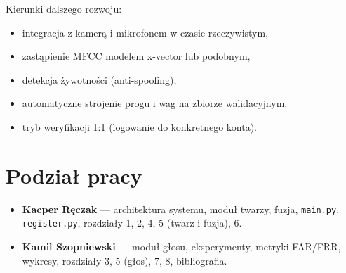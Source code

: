 Kierunki dalszego rozwoju:
\begin{itemize}
    \item integracja z kamerą i mikrofonem w czasie rzeczywistym,
    \item zastąpienie MFCC modelem x-vector lub podobnym,
    \item detekcja żywotności (anti-spoofing),
    \item automatyczne strojenie progu i wag na zbiorze walidacyjnym,
    \item tryb weryfikacji 1:1 (logowanie do konkretnego konta).
\end{itemize}

\section{Podział pracy}

\begin{itemize}
    \item \textbf{Kacper Ręczak} --- architektura systemu, moduł twarzy, fuzja, \texttt{main.py}, \texttt{register.py}, rozdziały 1, 2, 4, 5 (twarz i fuzja), 6.
    \item \textbf{Kamil Szopniewski} --- moduł głosu, eksperymenty, metryki FAR/FRR, wykresy, rozdziały 3, 5 (głos), 7, 8, bibliografia.
\end{itemize}
